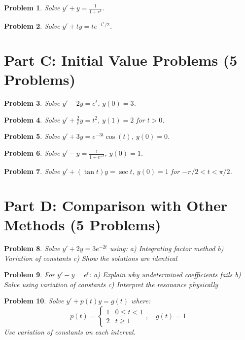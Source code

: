 \documentclass[12pt]{article}
\newtheorem{problem}{Problem}
\begin{document}
\begin{problem}
Solve $y' + y = \frac{1}{1+e^t}$.
\end{problem}

\begin{problem}
Solve $y' + ty = te^{-t^2/2}$.
\end{problem}

\section*{Part C: Initial Value Problems (5 Problems)}

\begin{problem}
Solve $y' - 2y = e^t$, $y(0) = 3$.
\end{problem}

\begin{problem}
Solve $y' + \frac{2}{t}y = t^2$, $y(1) = 2$ for $t > 0$.
\end{problem}

\begin{problem}
Solve $y' + 3y = e^{-3t}\cos(t)$, $y(0) = 0$.
\end{problem}

\begin{problem}
Solve $y' - y = \frac{1}{1+e^{-t}}$, $y(0) = 1$.
\end{problem}

\begin{problem}
Solve $y' + (\tan t)y = \sec t$, $y(0) = 1$ for $-\pi/2 < t < \pi/2$.
\end{problem}

\section*{Part D: Comparison with Other Methods (5 Problems)}

\begin{problem}
Solve $y' + 2y = 3e^{-2t}$ using:
a) Integrating factor method
b) Variation of constants
c) Show the solutions are identical
\end{problem}

\begin{problem}
For $y' - y = e^t$:
a) Explain why undetermined coefficients fails
b) Solve using variation of constants
c) Interpret the resonance physically
\end{problem}

\begin{problem}
Solve $y' + p(t)y = g(t)$ where:
\[p(t) = \begin{cases} 1 & 0 \leq t < 1 \\ 2 & t \geq 1 \end{cases}, \quad g(t) = 1\]
Use variation of constants on each interval.
\end{problem}
\end{document}
